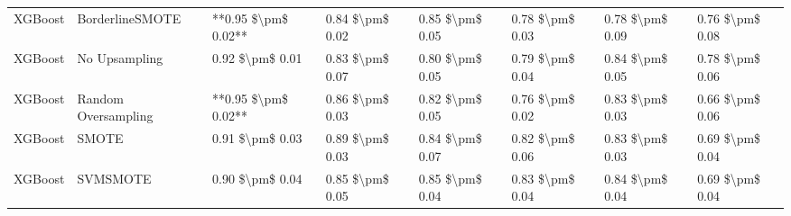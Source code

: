 \begin{tabular}{llllllll}
                        XGBoost &               BorderlineSMOTE & **0.95 \$\textbackslash pm\$ 0.02** &           0.84 \$\textbackslash pm\$ 0.02 &       0.85 \$\textbackslash pm\$ 0.05 &        0.78 \$\textbackslash pm\$ 0.03 &                         0.78 \$\textbackslash pm\$ 0.09 & 0.76 \$\textbackslash pm\$ 0.08 \\
                        XGBoost &                 No Upsampling &     0.92 \$\textbackslash pm\$ 0.01 &           0.83 \$\textbackslash pm\$ 0.07 &       0.80 \$\textbackslash pm\$ 0.05 &        0.79 \$\textbackslash pm\$ 0.04 &                         0.84 \$\textbackslash pm\$ 0.05 & 0.78 \$\textbackslash pm\$ 0.06 \\
                        XGBoost &           Random Oversampling & **0.95 \$\textbackslash pm\$ 0.02** &           0.86 \$\textbackslash pm\$ 0.03 &       0.82 \$\textbackslash pm\$ 0.05 &        0.76 \$\textbackslash pm\$ 0.02 &                         0.83 \$\textbackslash pm\$ 0.03 & 0.66 \$\textbackslash pm\$ 0.06 \\
                        XGBoost &                         SMOTE &     0.91 \$\textbackslash pm\$ 0.03 &           0.89 \$\textbackslash pm\$ 0.03 &       0.84 \$\textbackslash pm\$ 0.07 &        0.82 \$\textbackslash pm\$ 0.06 &                         0.83 \$\textbackslash pm\$ 0.03 & 0.69 \$\textbackslash pm\$ 0.04 \\
                        XGBoost &                      SVMSMOTE &     0.90 \$\textbackslash pm\$ 0.04 &           0.85 \$\textbackslash pm\$ 0.05 &       0.85 \$\textbackslash pm\$ 0.04 &        0.83 \$\textbackslash pm\$ 0.04 &                         0.84 \$\textbackslash pm\$ 0.04 & 0.69 \$\textbackslash pm\$ 0.04 \\
\bottomrule
\end{tabular}
